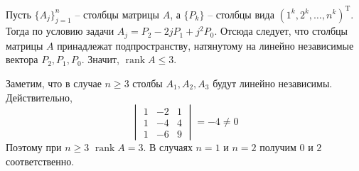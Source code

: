 \documentclass{article}
\DeclareMathOperator{\rank}{rank}
\begin{document}
Пусть $\{A_j\}_{j=1}^n$ -- столбцы матрицы $A$, а $\{P_k\}$ -- столбцы вида $(1^k, 2^k, \ldots, n^k)^\mathrm{T}$.
Тогда по условию задачи $A_j = P_2 - 2jP_1 + j^2P_0$. Отсюда следует, что столбцы матрицы $A$ принадлежат подпространству, натянутому на линейно независимые вектора $P_2, P_1, P_0$.
Значит, $\rank A \leqslant 3$.

Заметим, что в случае  $n\geqslant 3$ столбы $A_1, A_2, A_3$ будут линейно независимы. Действительно,
$$\begin{vmatrix}
1&-2&1\\
1&-4&4\\
1&-6&9
\end{vmatrix}
= -4 \neq 0$$
Поэтому при $n\geqslant 3$ $\rank A = 3$. В случаях $n=1$ и $n=2$ получим $0$ и $2$ соответственно.
\end{document}
